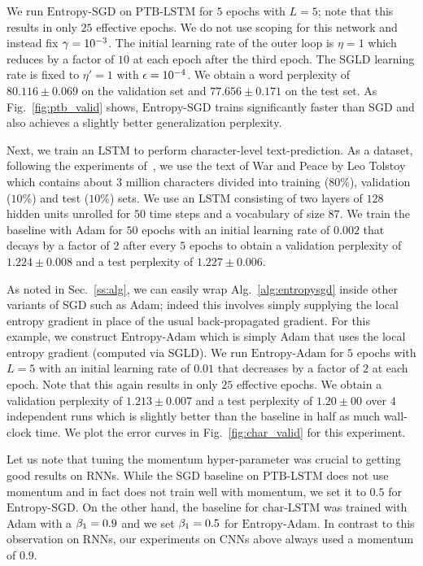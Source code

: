\documentclass[10pt]{article}
\newcommand{\entropysgd}{\mathrm{Entropy}\textrm{-}\mathrm{SGD}}
\newcommand{\entropyadam}{\mathrm{Entropy}\textrm{-}\mathrm{Adam}}
\newcommand{\charlstm}{\textrm{char-LSTM}}
\newcommand{\ptblstm}{\textrm{PTB-LSTM}}
\newcommand{\pc}[2]{{\color{ForestGreen}#1}\marginpar{\tiny\noindent{\raggedright{\color{Sienna}[PC]}\color{Sienna}{#2} \par}}}
\begin{document}
We run $\entropysgd$ on $\ptblstm$ for $5$ epochs with $L = 5$; note that this results in only $25$ effective epochs. We do not use scoping for this network and instead fix $\gamma = 10^{-3}$. The initial learning rate of the outer loop is $\eta = 1$ which reduces by a factor of $10$ at each epoch after the third epoch. The SGLD learning rate is fixed to $\eta' = 1$ with $\epsilon = 10^{-4}$. We obtain a word perplexity of $80.116 \pm 0.069$ on the validation set and $77.656 \pm 0.171$ on the test set. As Fig.~\ref{fig:ptb_valid} shows, $\entropysgd$ trains significantly faster than SGD and also achieves a slightly better generalization perplexity.

Next, we train an LSTM to perform character-level text-prediction. As a dataset, following the experiments of~\citet{karpathy2015visualizing}, we use the text of War and Peace by Leo Tolstoy which contains about $3$ million characters divided into training ($80\%$), validation ($10\%$) and test ($10\%$) sets. We use an LSTM consisting of two layers of $128$ hidden units unrolled for $50$ time steps and a vocabulary of size $87$. We train the baseline with Adam for $50$ epochs with an initial learning rate of $0.002$ that decays by a factor of $2$ after every $5$ epochs to obtain a validation perplexity of $1.224 \pm 0.008$ and a test perplexity of \pc{$1.227 \pm 0.006$}{this is a place-holder}.

As noted in Sec.~\ref{ss:alg}, we can easily wrap Alg.~\ref{alg:entropysgd} inside other variants of SGD such as Adam; indeed this involves simply supplying the local entropy gradient in place of the usual back-propagated gradient. For this example, we construct $\entropyadam$ which is simply Adam that uses the local entropy gradient (computed via SGLD). We run $\entropyadam$ for $5$ epochs with $L = 5$ with an initial learning rate of $0.01$ that decreases by a factor of $2$ at each epoch. Note that this again results in only $25$ effective epochs. We obtain a validation perplexity of $1.213 \pm 0.007$ and a test perplexity of \pc{$1.20 \pm 00$}{this is a place-holder} over $4$ independent runs which is slightly better than the baseline in half as much wall-clock time. We plot the error curves in Fig.~\ref{fig:char_valid} for this experiment.

Let us note that tuning the momentum hyper-parameter was crucial to getting good results on RNNs. While the SGD baseline on $\ptblstm$ does not use momentum and in fact does not train well with momentum, we set it to $0.5$ for $\entropysgd$. On the other hand, the baseline for $\charlstm$ was trained with Adam with a $\beta_1 = 0.9$ and we set $\beta_1 = 0.5$ for $\entropyadam$. In contrast to this observation on RNNs, our experiments on CNNs above always used a momentum of $0.9$.
\end{document}
